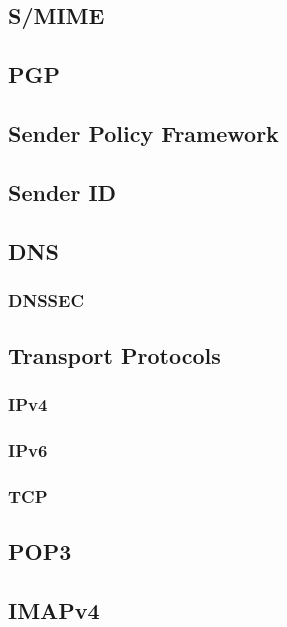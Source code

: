 \subsection{S/MIME}
\cite{RFC3851}

\subsection{PGP}
\cite{RFC2440}

\subsection{Sender Policy Framework}
\cite{RFC4408}
\cite{RFC6652}

\subsection{Sender ID}
\cite{RFC4401}

\subsection{DNS}
\cite{RFC2929}
\subsubsection{DNSSEC}
\cite{RFC5155}

\subsection{Transport Protocols}
\subsubsection{IPv4}
\cite{RFC760}
\cite{RFC791}
\cite{RFC1180}
\cite{RFC792}
\cite{RFC919}
\cite{RFC922}
\cite{RFC950}
\cite[p.~3]{RFC793}

\subsubsection{IPv6}
\cite{RFC2460}

\subsubsection{TCP}

\subsection{POP3}
\cite{RFC1939}

\subsection{IMAPv4}
\cite{RFC3501}

